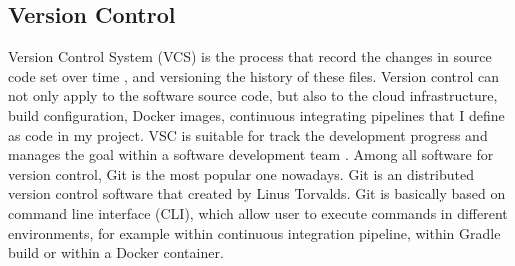 \subsection{Version Control}
\label{vcs}
Version Control System (VCS) is the process that record the changes in source code set over time \cite{GitAbout93:online}, and versioning the history of these files. 
Version control can not only apply to the software source code, but also to the cloud infrastructure, build configuration, Docker images, continuous integrating pipelines that I define as code in my project.
VSC is suitable for track the development progress and manages the goal within a software development team \cite{loeliger2012version}. Among all software for version control, Git is the most popular one nowadays.
Git is an distributed version control software that created by Linus Torvalds. Git is basically based on command line interface (CLI), which allow user to execute commands in different environments, for example within continuous integration pipeline, within Gradle build or within a Docker container.

